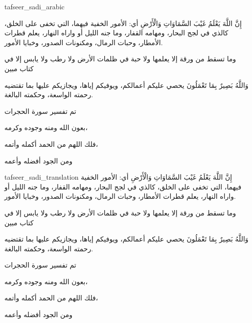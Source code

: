 \begin{taggedblock}{tafseer_sadi_arabic}
\begin{Arabic}
{ إِنَّ اللَّهَ يَعْلَمُ غَيْبَ السَّمَاوَاتِ وَالْأَرْضِ }
أي: الأمور الخفية فيهما، التي تخفى على الخلق، كالذي في لجج البحار، ومهامه القفار، وما جنه الليل أو واراه النهار، يعلم قطرات الأمطار، وحبات الرمال، ومكنونات الصدور، وخبايا الأمور.

{ وما تسقط من ورقة إلا يعلمها ولا حبة في ظلمات الأرض ولا رطب ولا يابس إلا في كتاب مبين }

{ وَاللَّهُ بَصِيرٌ بِمَا تَعْمَلُونَ }
يحصي عليكم أعمالكم، ويوفيكم إياها، ويجازيكم عليها بما تقتضيه رحمته الواسعة، وحكمته البالغة.

تم تفسير سورة الحجرات

بعون الله ومنه وجوده وكرمه،

فلك اللهم من الحمد أكمله وأتمه،

ومن الجود أفضله وأعمه
\end{Arabic}
\end{taggedblock}
\begin{taggedblock}{tafseer_sadi_translation}
{ إِنَّ اللَّهَ يَعْلَمُ غَيْبَ السَّمَاوَاتِ وَالْأَرْضِ }
أي: الأمور الخفية فيهما، التي تخفى على الخلق، كالذي في لجج البحار، ومهامه القفار، وما جنه الليل أو واراه النهار، يعلم قطرات الأمطار، وحبات الرمال، ومكنونات الصدور، وخبايا الأمور.

{ وما تسقط من ورقة إلا يعلمها ولا حبة في ظلمات الأرض ولا رطب ولا يابس إلا في كتاب مبين }

{ وَاللَّهُ بَصِيرٌ بِمَا تَعْمَلُونَ }
يحصي عليكم أعمالكم، ويوفيكم إياها، ويجازيكم عليها بما تقتضيه رحمته الواسعة، وحكمته البالغة.

تم تفسير سورة الحجرات

بعون الله ومنه وجوده وكرمه،

فلك اللهم من الحمد أكمله وأتمه،

ومن الجود أفضله وأعمه
\end{taggedblock}

\begin{comment}
Please use the following for footnotes:- Sample\footnoteQ{Text of Qur'an footnote goes here.}.
Sample\footnoteT{Text of Tafseer footnote goes here.}.
\end{comment}